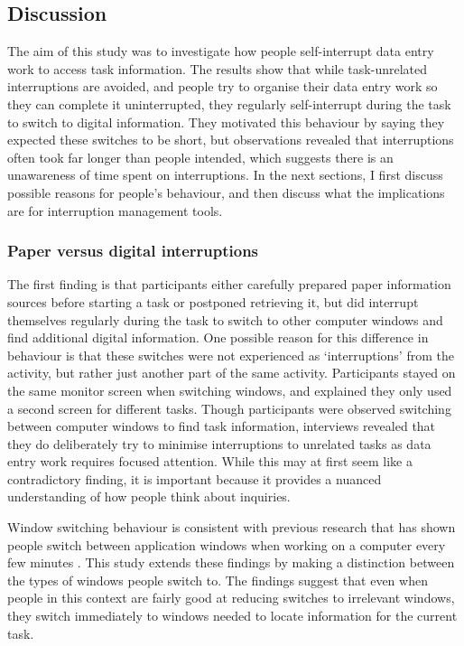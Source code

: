 \subsection{Discussion}
The aim of this study was to investigate how people self-interrupt data entry work to access task information. The results show that while task-unrelated interruptions are avoided, and people try to organise their data entry work so they can complete it uninterrupted, they regularly self-interrupt during the task to switch to digital information. They motivated this behaviour by saying they expected these switches to be short, but observations revealed that interruptions often took far longer than people intended, which suggests there is an unawareness of time spent on interruptions. In the next sections, I first discuss possible reasons for people's behaviour, and then discuss what the implications are for interruption management tools. 

\subsubsection{Paper versus digital interruptions}
The first finding is that participants either carefully prepared paper information sources before starting a task or postponed retrieving it, but did interrupt themselves regularly during the task to switch to other computer windows and find additional digital information. One possible reason for this difference in behaviour is that these switches were not experienced as ‘interruptions’ from the activity, but rather just another part of the same activity. Participants stayed on the same monitor screen when switching windows, and explained they only used a second screen for different tasks. Though participants were observed switching between computer windows to find task information, interviews revealed that they do deliberately try to minimise interruptions to unrelated tasks as data entry work requires focused attention. While this may at first seem like a contradictory finding, it is important because it provides a nuanced understanding of how people think about inquiries. 

Window switching behaviour is consistent with previous research that has shown people switch between application windows when working on a computer every few minutes \citep{Gonzalez2004}. This study extends these findings by making a distinction between the types of windows people switch to. The findings suggest that even when people in this context are fairly good at reducing switches to irrelevant windows, they switch immediately to windows needed to locate information for the current task. 

